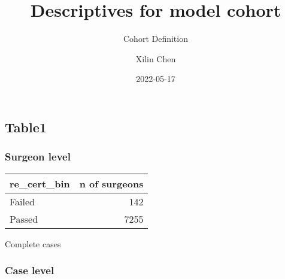 \documentclass[
]{article}
\title{Descriptives for model cohort}
\subtitle{Cohort Definition}
\author{Xilin Chen}
\date{2022-05-17}
\begin{document}
\maketitle

{
\setcounter{tocdepth}{3}
\tableofcontents
}
\hypertarget{table1}{%
\subsection{Table1}\label{table1}}

\hypertarget{surgeon-level}{%
\subsubsection{Surgeon level}\label{surgeon-level}}

\begin{table}
\centering
\begin{tabular}{l|r}
\hline
re\_cert\_bin & n of surgeons\\
\hline
Failed & 142\\
\hline
Passed & 7255\\
\hline
\end{tabular}
\end{table}

Complete cases

\hypertarget{case-level}{%
\subsubsection{Case level}\label{case-level}}

\providecommand{\docline}[3]{\noalign{\global\setlength{\arrayrulewidth}{#1}}\arrayrulecolor[HTML]{#2}\cline{#3}}

\setlength{\tabcolsep}{2pt}

\renewcommand*{\arraystretch}{1.5}
\end{document}
